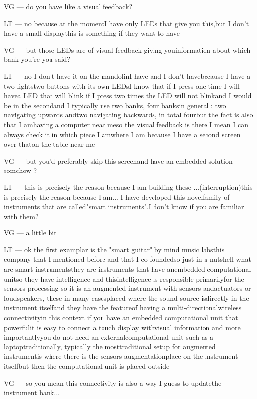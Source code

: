 VG — do you have like a visual feedback?

LT — no because at the momentI have only LEDs that give you this,but I don't have a small displaythis is something if they want to have

VG — but those LEDs are of visual feedback giving youinformation about which bank you're you said?

LT — no I don't have it on the mandolinI have and I don't havebecause I have a two lightstwo buttons with its own LEDsI know that if I press one time I will havea LED that will blink if I press two times the LED will not blinkand I would be in the secondand I typically use two banks, four banksin general : two navigating upwards andtwo navigating backwards, in total fourbut the fact is also that I amhaving a computer near meso the visual feedback is there I mean I can always check it in which piece I amwhere I am because I have a second screen over thaton the table near me

VG — but you'd preferably skip this screenand have an embedded solution somehow ?

LT — this is precisely the reason because I am building these ...(interruption)this is precisely the reason because I am... I have developed this novelfamily of instruments that are called"smart instruments".I don't know if you are familiar with them?

VG — a little bit

LT — ok the first examplar is the "smart guitar" by mind music labsthis company that I mentioned before and that I co-foundedso just in a nutshell what are smart instrumentsthey are instruments that have anembedded computational unitso they have intelligence and thisintelligence is responsible primarilyfor the sensors processing so it is an augmented instrument with sensors andactuators or loudspeakers, these in many casesplaced where the sound source isdirectly in the instrument itselfand they have the featureof having a multi-directionalwireless connectivityin this context if you have an embedded computational unit that powerfulit is easy to connect a touch display withvisual information and more importantlyyou do not need an externalcomputational unit such as a laptoptraditionally, typically the mosttraditional setup for augmented instrumentis where there is the sensors augmentationplace on the instrument itselfbut then the computational unit is placed outside

VG — so you mean this connectivity is also a way I guess to updatethe instrument bank... 

